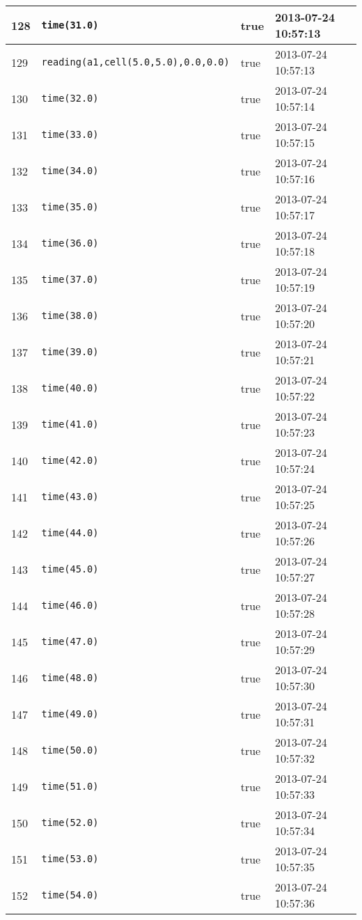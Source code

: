 \documentclass[11pt]{article}\usepackage[utf8]{inputenc}\usepackage{geometry}
\begin{document}
\begin{table}[ht]
\begin{tabular}{l l l l}
128&\texttt{time(31.0)}&true&2013-07-24 10:57:13\\ [1ex] \hline
129&\texttt{reading(a1,cell(5.0,5.0),0.0,0.0)}&true&2013-07-24 10:57:13\\ [1ex] \hline
130&\texttt{time(32.0)}&true&2013-07-24 10:57:14\\ [1ex] \hline
131&\texttt{time(33.0)}&true&2013-07-24 10:57:15\\ [1ex] \hline
132&\texttt{time(34.0)}&true&2013-07-24 10:57:16\\ [1ex] \hline
133&\texttt{time(35.0)}&true&2013-07-24 10:57:17\\ [1ex] \hline
134&\texttt{time(36.0)}&true&2013-07-24 10:57:18\\ [1ex] \hline
135&\texttt{time(37.0)}&true&2013-07-24 10:57:19\\ [1ex] \hline
136&\texttt{time(38.0)}&true&2013-07-24 10:57:20\\ [1ex] \hline
137&\texttt{time(39.0)}&true&2013-07-24 10:57:21\\ [1ex] \hline
138&\texttt{time(40.0)}&true&2013-07-24 10:57:22\\ [1ex] \hline
139&\texttt{time(41.0)}&true&2013-07-24 10:57:23\\ [1ex] \hline
140&\texttt{time(42.0)}&true&2013-07-24 10:57:24\\ [1ex] \hline
141&\texttt{time(43.0)}&true&2013-07-24 10:57:25\\ [1ex] \hline
142&\texttt{time(44.0)}&true&2013-07-24 10:57:26\\ [1ex] \hline
143&\texttt{time(45.0)}&true&2013-07-24 10:57:27\\ [1ex] \hline
144&\texttt{time(46.0)}&true&2013-07-24 10:57:28\\ [1ex] \hline
145&\texttt{time(47.0)}&true&2013-07-24 10:57:29\\ [1ex] \hline
146&\texttt{time(48.0)}&true&2013-07-24 10:57:30\\ [1ex] \hline
147&\texttt{time(49.0)}&true&2013-07-24 10:57:31\\ [1ex] \hline
148&\texttt{time(50.0)}&true&2013-07-24 10:57:32\\ [1ex] \hline
149&\texttt{time(51.0)}&true&2013-07-24 10:57:33\\ [1ex] \hline
150&\texttt{time(52.0)}&true&2013-07-24 10:57:34\\ [1ex] \hline
151&\texttt{time(53.0)}&true&2013-07-24 10:57:35\\ [1ex] \hline
152&\texttt{time(54.0)}&true&2013-07-24 10:57:36\\ [1ex] \hline

\end{tabular}
\end{table}
\end{document}
